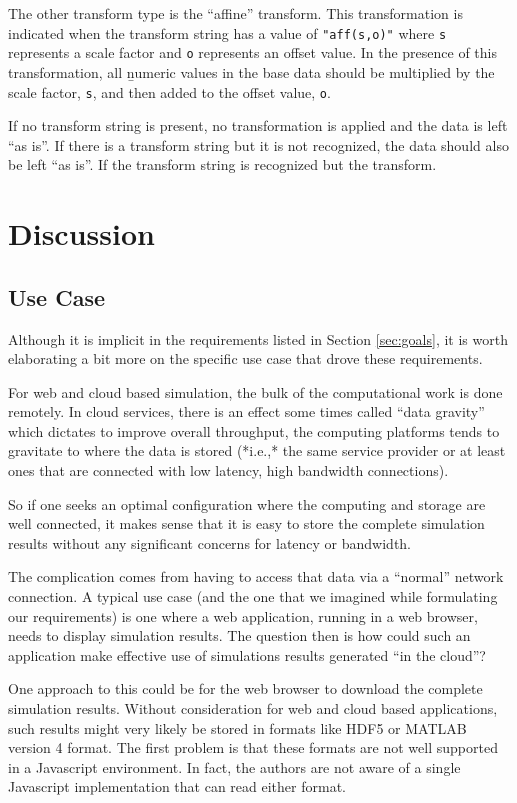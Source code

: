 \documentclass[11pt,a4paper,onecolumn]{article}
\newcommand{\code}[1]{\texttt{#1}} %
\begin{document}
The other transform type is the ``affine'' transform.  This
transformation is indicated when the transform string has a value of
\code{"aff(s,o)"} where \code{s} represents a scale factor and
\code{o} represents an offset value.  In the presence of this
transformation, all {\b numeric} values in the base data should be
multiplied by the scale factor, \code{s}, and then added to the offset
value, \code{o}.

If no transform string is present, no transformation is applied and
the data is left ``as is''.  If there is a transform string but it is
not recognized, the data should also be left ``as is''.  If the
transform string is recognized but the transform.

\section{Discussion}
\label{sec:discussion}

\subsection{Use Case}

Although it is implicit in the requirements listed in Section
\ref{sec:goals}, it is worth elaborating a bit more on the specific
use case that drove these requirements.

For web and cloud based simulation, the bulk of the computational work
is done remotely.  In cloud services, there is an effect some times
called ``data gravity'' which dictates to improve overall throughput,
the computing platforms tends to gravitate to where the data is stored
(*i.e.,* the same service provider or at least ones that are connected
with low latency, high bandwidth connections).

So if one seeks an optimal configuration where the computing and
storage are well connected, it makes sense that it is easy to store
the complete simulation results without any significant concerns for
latency or bandwidth.

The complication comes from having to access that data via a
``normal'' network connection.  A typical use case (and the one that
we imagined while formulating our requirements) is one where a web
application, running in a web browser, needs to display simulation
results.  The question then is how could such an application make
effective use of simulations results generated ``in the cloud''?

One approach to this could be for the web browser to download the
complete simulation results.  Without consideration for web and cloud
based applications, such results might very likely be stored in
formats like HDF5 or MATLAB version 4 format.  The first problem is
that these formats are not well supported in a Javascript environment.
In fact, the authors are not aware of a single Javascript
implementation that can read either format.
\end{document}
